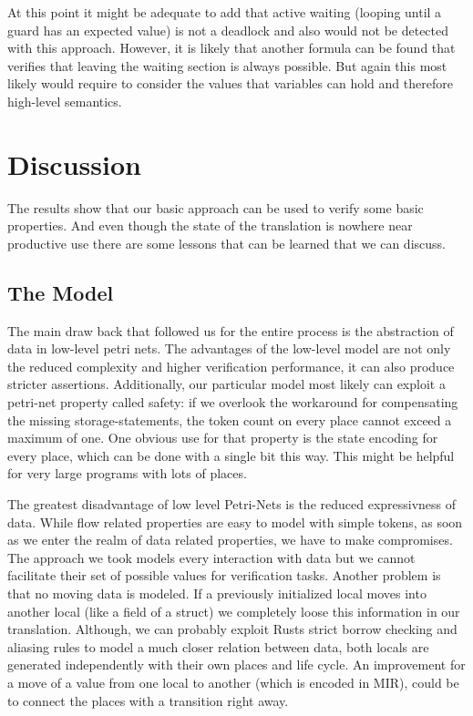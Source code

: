 At this point it might be adequate to add that active waiting (looping until a guard has an expected value) is not a deadlock and also would not be detected with this approach.
However, it is likely that another formula can be found that verifies that leaving the waiting section is always possible.
But again this most likely would require to consider the values that variables can hold and therefore high-level semantics.

\section{Discussion}
The results show that our basic approach can be used to verify some basic properties.
And even though the state of the translation is nowhere near productive use there are some lessons that can be learned that we can discuss.
\subsection{The Model}
The main draw back that followed us for the entire process is the abstraction of data in low-level petri nets.
The advantages of the low-level model are not only the reduced complexity and higher verification performance, it can also produce stricter assertions.
Additionally, our particular model most likely can exploit a petri-net property called safety:
if we overlook the workaround for compensating the missing storage-statements, the token count on every place cannot exceed a maximum of one.
One obvious use for that property is the state encoding for every place, which can be done with a single bit this way.
This might be helpful for very large programs with lots of places.

The greatest disadvantage of low level Petri-Nets is the reduced expressivness of data.
While flow related properties are easy to model with simple tokens, as soon as we enter the realm of data related properties, we have to make compromises.
The approach we took models every interaction with data but we cannot facilitate their set of possible values for verification tasks.
Another problem is that no moving data is modeled.
If a previously initialized local moves into another local (like a field of a struct) we completely loose this information in our translation.
Although, we can probably exploit Rusts strict borrow checking and aliasing rules to model a much closer relation between data,
both locals are generated independently with their own places and life cycle.
An improvement for a move of a value from one local to another (which is encoded in MIR), could be to connect the places with a transition right away.

